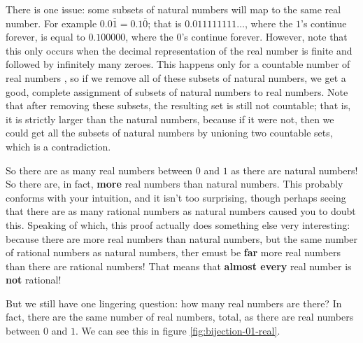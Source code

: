 There is one issue: some subsets of natural numbers will map to the same real number.
For example $0.0\overline{1} = 0.1\overline{0}$; that is $0.011111111\ldots$, where the $1$'s continue forever, is equal to $0.100000$, where the $0$'s continue forever. 
However, note that this only occurs when the decimal representation of the real number is finite and followed by infinitely many zeroes.
This happens only for a countable number of real numbers , so if we remove all of these subsets of natural numbers, we get a good, complete assignment of subsets of natural numbers to real numbers.
Note that after removing these subsets, the resulting set is still not countable; that is, it is strictly larger than the natural numbers, because if it were not, then we could get all the subsets of natural numbers by unioning two countable sets, which is a contradiction. 

So there are as many real numbers between $0$ and $1$ as there are natural numbers!
So there are, in fact, \textbf{more} real numbers than natural numbers.
This probably conforms with your intuition, and it isn't too surprising, though perhaps seeing that there are as many rational numbers as natural numbers caused you to doubt this.
Speaking of which, this proof actually does something else very interesting: because there are more real numbers than natural numbers, but the same number of rational numbers as natural numbers, ther emust be \textbf{far} more real numbers than there are rational numbers!
That means that \textbf{almost every} real number is \textbf{not} rational!

But we still have one lingering question: how many real numbers are there?
In fact, there are the same number of real numbers, total, as there are real numbers between $0$ and $1$.
We can see this in figure \ref{fig:bijection-01-real}.

